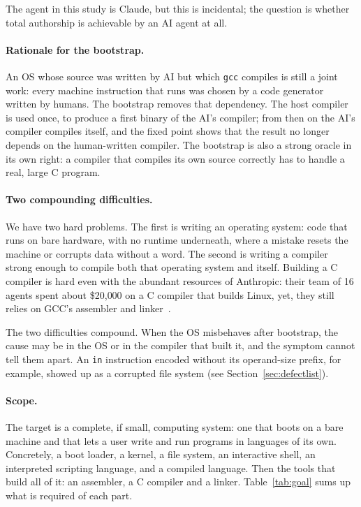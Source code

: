\documentclass{article}
\begin{document}
The agent in this study is Claude, but this is incidental; the question is whether
total authorship is achievable by an AI agent at all. 

\paragraph{Rationale for the bootstrap.} An OS whose source was written by AI but which \texttt{gcc}
compiles is still a joint work: every machine instruction that runs was chosen by a code
generator written by humans. The bootstrap removes that dependency. The host compiler is
used once, to produce a first binary of the AI's compiler; from then on the AI's compiler
compiles itself, and the fixed point shows that the result no longer depends on the human-written
compiler. The bootstrap is also a strong oracle in its own right: a
compiler that compiles its own source correctly has to handle a real, large C program.

\paragraph{Two compounding difficulties.} We have two hard problems. The first is
writing an operating system: code that runs on bare hardware, with no runtime underneath, where
a mistake resets the machine or corrupts data without a word. The second is writing a compiler
strong enough to compile both that operating system and itself. 
Building a C compiler is
hard even with the abundant resources of Anthropic: their team of 16 agents spent about \$20{,}000
on a C compiler that builds Linux, yet, they still relies on GCC's assembler and
linker~\cite{carlini2026ccc}. 

The two difficulties
compound. When the OS misbehaves after bootstrap, the cause may be in the OS or in the compiler that
built it, and the symptom cannot tell them apart. An \texttt{in} instruction encoded without its
operand-size prefix, for example, showed up as a corrupted file system
(see Section~\ref{sec:defectlist}).

\paragraph{Scope.} The target is a complete, if small, computing system: one that boots
on a bare machine and that lets a user write and run programs in
languages of its own. Concretely, a boot loader, a kernel, a file system, an interactive
shell, an interpreted scripting language, and a compiled language. Then the tools that build all of it: an assembler, a C compiler and a linker.
Table~\ref{tab:goal} sums up what is required of each part.
\end{document}
